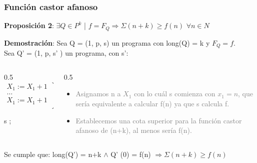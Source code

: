 \documentclass[xcolor=table]{beamer}
\begin{document}
\begin{frame}[fragile]\frametitle{Función castor afanoso} \scriptsize

\textbf{Proposición 2}: $\exists Q \in P^k$ | $f = F_Q \Rightarrow \Sigma (n+k) \geq f(n)$ 
 $\forall n \in N$

\hspace{1cm}

\textbf{Demostración}:
Sea Q = (1, p, s) un programa con long(Q) = k y $F_Q = f$.\\

Sea Q' = (1, p, s' ) un programa, con s':\\

\begin{columns}
    \begin{column}{0.5\textwidth}
\begin{equation*} \left.
\begin{aligned} 
X_1 := X_1 + 1\\
\ldots\\
X_1 := X_1 + 1\\
\end{aligned} \right\} \qquad \text{n veces} 
\end{equation*}
\begin{center}
s ;
\end{center}
    \end{column}
    \begin{column}{0.5\textwidth}
        \begin{itemize}
            \item \textcolor{gray}{Asignamos n a $X_1$ con lo cuál s comienza con $x_1 = n$, que sería equivalente a calcular f(n) ya que s calcula f.}\\
         
            \item \textcolor{gray}{Establecemos una cota superior para la función castor afanoso de (n+k), al menos sería f(n).}\\
        \end{itemize}
        
        
    \end{column}
\end{columns}\break

\vspace{0.3cm}
Se cumple que: long(Q') = n+k $\wedge$ Q' (0) = f(n) $\Rightarrow \Sigma(n+k) \geq f(n)$


\end{frame}
\end{document}
